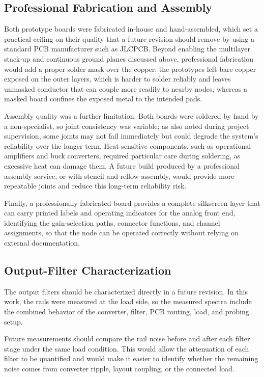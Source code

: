 \subsection{Professional Fabrication and Assembly}

Both prototype boards were fabricated in-house and hand-assembled, which set a practical ceiling on their quality that a future revision should remove by using a standard PCB manufacturer such as JLCPCB. Beyond enabling the multilayer stack-up and continuous ground planes discussed above, professional fabrication would add a proper solder mask over the copper: the prototypes left bare copper exposed on the outer layers, which is harder to solder reliably and leaves unmasked conductor that can couple more readily to nearby nodes, whereas a masked board confines the exposed metal to the intended pads.

Assembly quality was a further limitation. Both boards were soldered by hand by a non-specialist, so joint consistency was variable; as also noted during project supervision, some joints may not fail immediately but could degrade the system's reliability over the longer term. Heat-sensitive components, such as operational amplifiers and buck converters, required particular care during soldering, as excessive heat can damage them. A future build produced by a professional assembly service, or with stencil and reflow assembly, would provide more repeatable joints and reduce this long-term reliability risk.

Finally, a professionally fabricated board provides a complete silkscreen layer that can carry printed labels and operating indicators for the analog front end, identifying the gain-selection paths, connector functions, and channel assignments, so that the node can be operated correctly without relying on external documentation.

\subsection{Output-Filter Characterization}

The output filters should be characterized directly in a future revision. In this work, the rails were measured at the load side, so the measured spectra include the combined behavior of the converter, filter, PCB routing, load, and probing setup.

Future measurements should compare the rail noise before and after each filter stage under the same load condition. This would allow the attenuation of each filter to be quantified and would make it easier to identify whether the remaining noise comes from converter ripple, layout coupling, or the connected load.

